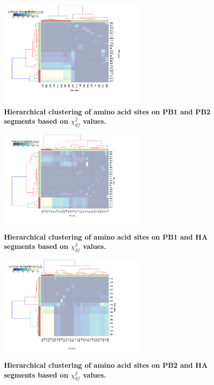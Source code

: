 \documentclass[11pt,oneside,letterpaper]{article}
\begin{document}
\begin{figure}
\centering  
\includegraphics[width=0.65\textwidth]  {supp_figures/Chi_PB1_PB2.png}
\caption{\textbf{Hierarchical clustering of amino acid sites on PB1 and PB2 segments based on $\chi^{2}_{df}$ values.}}
\label{ChiPB1PB2}
\end{figure}


\begin{figure}
\centering  
\includegraphics[width=0.65\textwidth]  {supp_figures/Chi_PB1_HA.png}
\caption{\textbf{Hierarchical clustering of amino acid sites on PB1 and HA segments based on $\chi^{2}_{df}$ values.}}
\label{ChiPB1HA}
\end{figure}


\begin{figure}
\centering  
\includegraphics[width=0.65\textwidth]  {supp_figures/Chi_PB2_HA.png}
\caption{\textbf{Hierarchical clustering of amino acid sites on PB2 and HA segments based on $\chi^{2}_{df}$ values.}}
\label{ChiPB2HA}
\end{figure}
\end{document}
